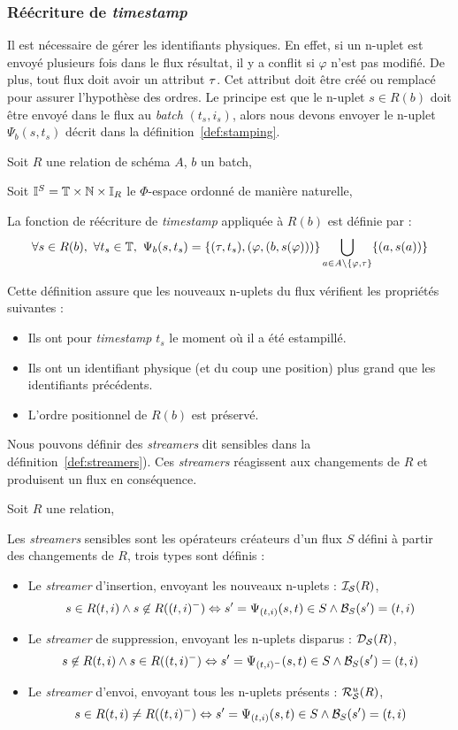 \subsubsection{Réécriture de \textit{timestamp}}
Il est nécessaire de gérer les identifiants physiques. En effet, si un n-uplet est envoyé plusieurs fois dans le flux résultat, il y a conflit si $\varphi$ n'est pas modifié. De plus, tout flux doit avoir un attribut $\tau$. Cet attribut doit être créé ou remplacé pour assurer l'hypothèse des ordres. Le principe est que le n-uplet $s\in R(b)$ doit être envoyé dans le flux au \textit{batch} $(t_s,i_s)$, alors nous devons envoyer le n-uplet $\Psi_b(s,t_s)$ décrit dans la définition~\ref{def:stamping}.
\begin{defi}\label{def:stamping}
    Soit $R$ une relation de schéma $A$, $b$ un batch,

    Soit $\mathbb{I}^S = \mathbb{T}\times\mathbb{N}\times \mathbb{I}_R$ le $\Phi$-espace ordonné de manière naturelle,

    La fonction de réécriture de \textit{timestamp} appliquée à $R(b)$ est définie par : 
$$\forall s\in R(b), \ \forall t_s\in\T, \ \Psi_b(s,t_s) = \{(\t,t_s), (\varphi, (b,s(\varphi)))\}\bigcup_{a\in A\backslash\{\varphi,\t\}}\{(a,s(a))\}$$
\end{defi}

Cette définition assure que les nouveaux n-uplets du flux vérifient les propriétés suivantes : 
\begin{itemize}
 \item Ils ont pour \textit{timestamp} $t_s$ le moment où il a été estampillé.
 \item Ils ont un identifiant physique (et du coup une position) plus grand que les identifiants précédents.
 \item L'ordre positionnel de $R(b)$ est préservé.
\end{itemize}
Nous pouvons définir des \textit{streamers} dit sensibles dans la définition~\ref{def:streamers}). Ces \textit{streamers} réagissent aux changements de $R$ et produisent un flux en conséquence.
\begin{defi}\label{def:streamers}
    Soit $R$ une relation,

    Les \textit{streamers} sensibles sont les opérateurs créateurs d'un flux $S$ défini à partir des changements de $R$, trois types sont définis :
\begin{itemize}
 \item Le \textit{streamer} d'insertion, envoyant les nouveaux n-uplets : $\mathcal{I_S}(R)$, $$s\in R(t,i) \wedge s\not\in R((t,i)^-) \Leftrightarrow s'=\Psi_{(t,i)}(s,t)\in S \wedge \mathcal{B}_S(s') = (t,i)$$
 \item Le \textit{streamer} de suppression, envoyant les n-uplets disparus : $\mathcal{D_S}(R)$, $$s\not\in R(t,i) \wedge s\in R((t,i)^-) \Leftrightarrow s'=\Psi_{(t,i)^-}(s,t)\in S \wedge \mathcal{B}_S(s') = (t,i)$$
 \item Le \textit{streamer} d'envoi, envoyant tous les n-uplets présents : $\mathcal{R}_{\mathcal S}^{u}(R)$, $$s\in R(t,i) \neq R((t,i)^-) \Leftrightarrow s'=\Psi_{(t,i)}(s,t)\in S \wedge \mathcal{B}_S(s') = (t,i)$$
\end{itemize}
\end{defi}

